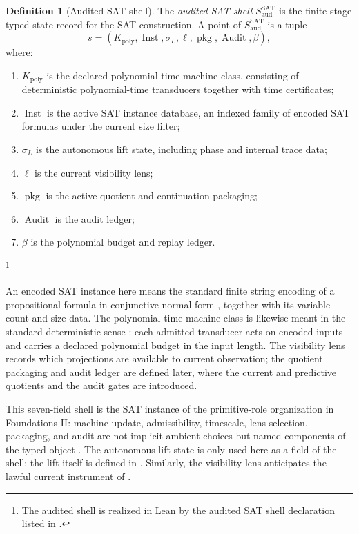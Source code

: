 \documentclass[11pt]{article}
\newcommand{\Saud}{S_{\mathrm{aud}}^{\mathrm{SAT}}}
\theoremstyle{definition}
\newtheorem{definition}[theorem]{Definition}
\begin{document}
\begin{definition}[Audited SAT shell]
\label{def:pvnp:audited-shell}
The \emph{audited SAT shell} \(\Saud\) is the finite-stage typed
state record for the SAT construction.  A point of \(\Saud\) is a
tuple
\[
  s=(K_{\mathrm{poly}},\operatorname{Inst},\sigma_{L},\ell,
       \operatorname{pkg},\operatorname{Audit},\beta),
\]
where:
\begin{enumerate}
  \item \(K_{\mathrm{poly}}\) is the declared polynomial-time machine
  class, consisting of deterministic polynomial-time transducers
  together with time certificates;
  \item \(\operatorname{Inst}\) is the active SAT instance database,
  an indexed family of encoded SAT formulas under the current size
  filter;
  \item \(\sigma_{L}\) is the autonomous lift state, including phase
  and internal trace data;
  \item \(\ell\) is the current visibility lens;
  \item \(\operatorname{pkg}\) is the active quotient and
  continuation packaging;
  \item \(\operatorname{Audit}\) is the audit ledger;
  \item \(\beta\) is the polynomial budget and replay ledger.
\end{enumerate}
\footnote{The audited shell is realized in Lean by the audited SAT
shell declaration listed in .}
\end{definition}

An encoded SAT instance here means the standard finite string
encoding of a propositional formula in conjunctive normal form
\citep{Cook1971TheoremProving,GareyJohnson1979Intractability},
together with its variable count and size data.  The polynomial-time
machine class is likewise meant in the standard deterministic sense
\citep{AroraBarak2009Complexity}: each admitted transducer acts on
encoded inputs and carries a declared polynomial budget in the input
length.  The visibility lens records
which projections are available to current observation; the quotient
packaging and audit ledger are defined later, where the current and
predictive quotients and the audit gates are introduced.

This seven-field shell is the SAT instance of the primitive-role
organization in Foundations II: machine update, admissibility,
timescale, lens selection, packaging, and audit are not implicit
ambient choices but named components of the typed object
\citep{TsiokosFoundationsII2026}.  The autonomous lift state is only
used here as a field of the shell; the lift itself is defined in
.  Similarly, the visibility lens anticipates
the lawful current instrument of .
\end{document}

